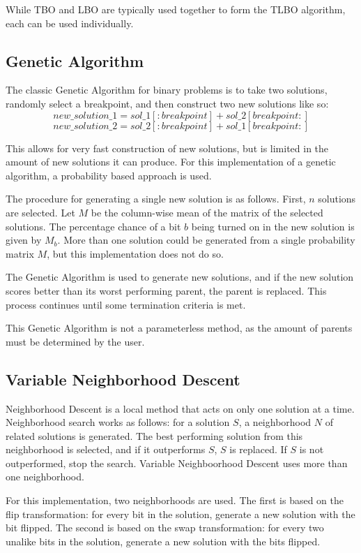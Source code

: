 \documentclass[11pt, letterpaper, onecolumn]{article}
\begin{document}
While TBO and LBO are typically used together to form the TLBO algorithm, each can be used individually. 

\subsection{Genetic Algorithm}

The classic Genetic Algorithm for binary problems is to take two solutions, randomly select a breakpoint, and then construct two new solutions like so:
\begin{equation}
new\_solution\_1 = sol\_1[:breakpoint] + sol\_2[breakpoint:]
\end{equation}
$$ new\_solution\_2 = sol\_2[:breakpoint] + sol\_1[breakpoint:] $$

This allows for very fast construction of new solutions, but is limited in the amount of new solutions it can produce. For this implementation of a genetic algorithm, a probability based approach is used. 

The procedure for generating a single new solution is as follows. First, $n$ solutions are selected. Let $M$ be the column-wise mean of the matrix of the selected solutions. The percentage chance of a bit $b$ being turned on in the new solution is given by $M_b$. More than one solution could be generated from a single probability matrix $M$, but this implementation does not do so. 

The Genetic Algorithm is used to generate new solutions, and if the new solution scores better than its worst performing parent, the parent is replaced. This process continues until some termination criteria is met. 

This Genetic Algorithm is not a parameterless method, as the amount of parents must be determined by the user.

\subsection{Variable Neighborhood Descent}

Neighborhood Descent is a local method that acts on only one solution at a time. Neighborhood search works as follows: for a solution $S$, a neighborhood $N$ of related solutions is generated. The best performing solution from this neighborhood is selected, and if it outperforms $S$, $S$ is replaced. If $S$ is not outperformed, stop the search. Variable Neighboorhood Descent uses more than one neighborhood. 

For this implementation, two neighborhoods are used. The first is based on the flip transformation: for every bit in the solution, generate a new solution with the bit flipped. The second is based on the swap transformation: for every two unalike bits in the solution, generate a new solution with the bits flipped.  
\end{document}
